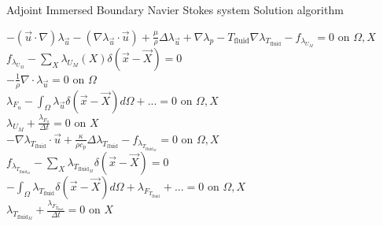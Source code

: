 \documentclass[10pt]{article} %
\begin{document}
\begin{center}
\begin{flushleft}
	Adjoint Immersed Boundary Navier Stokes system Solution algorithm
\end{flushleft}
	$-(\vec{u}\cdot\nabla) \lambda_{\vec{u}} - \left(\nabla \lambda_{\vec{u}} \cdot \vec{u}\right) + \frac{\mu}{\rho} \Delta \lambda_{\vec{u}} + \nabla\lambda_p - T_{\text{fluid}} \nabla \lambda_{T_{\text{fluid}}} - f_{\lambda_{U_M}} = 0$ \quad on $\Omega,X$\\
	$f_{\lambda_{U_M}} - \sum_X \lambda_{U_M}(X) \delta(\vec{x}-\vec{X}) = 0$\\
	$-\frac{1}{\rho} \nabla \cdot \lambda_{\vec{u}} = 0$ \quad on $\Omega$\\
	$\lambda_{F_u} - \int_{\Omega} \lambda_{\vec{u}} \delta (\vec{x}-\vec{X}) d\Omega + ... = 0$ \quad on $\Omega,X$\\
	$\lambda_{U_M} + \frac{\lambda_{F_u}}{\Delta t}=0$ \quad on $X$\\
	$-\nabla \lambda_{T_{\text{fluid}}} \cdot \vec{u} + \frac{\kappa}{\rho c_p} \Delta  \lambda_{T_{\text{fluid}}} - f_{\lambda_{T_{\text{fluid}_M}}} = 0$ \quad on $\Omega,X$\\
	$f_{\lambda_{T_{\text{fluid}_M}}} - \sum_{X} \lambda_{T_{\text{fluid}_M}} \delta (\vec{x}-\vec{X}) = 0$\\
	$-\int_{\Omega} \lambda_{T_{\text{fluid}}} \delta (\vec{x}-\vec{X}) d\Omega + \lambda_{F_{T_{\text{fluid}}}} + ... = 0$ \quad on $\Omega, X$\\
	$\lambda_{T_{\text{fluid}_M}} + \frac{\lambda_{F_{T_{\text{fluid}}}}}{\Delta t} =0$ \quad on $X$
	

\end{center}
\end{document}
